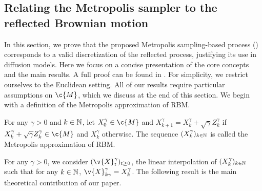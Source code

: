 \begin{table}[t]
	\centering
	\caption{Comparing the requirements of different constrained diffusion models.}
	\label{tab:general_method_comparison}

\end{table}

\subsection{Relating the Metropolis sampler to the reflected Brownian motion}
\label{sec:theoretical_convergence}

In this section, we prove that the proposed Metropolis sampling-based process () corresponds to a valid discretization of the reflected process, justifying its use in diffusion models.
Here we focus on a concise presentation of the core concepts and the main results.
A full proof can be found in .
For simplicity, we restrict ourselves to the Euclidean setting.
All of our results require particular assumptions on $\c{M}$, which we discuss at the end of this section.
We begin with a definition of the Metropolis approximation of RBM.

\begin{definition}
	For any $\gamma >0$ and $k \in \mathbb{N}$, let $X_0^\gamma \in \c{M}$ and $X_{k+1}^\gamma = X_k^\gamma + \sqrt{\gamma} Z_k^\gamma$ if $X_k^\gamma + \sqrt{\gamma} Z_k^\gamma \in \c{M}$ and $X_k^\gamma$ otherwise.
	The sequence $(X_k^\gamma)_{k \in \mathbb{N}}$ is called the {Metropolis approximation of RBM}.
\end{definition}
For any $\gamma > 0$, we consider $(\v{X}_t^\gamma)_{t \geq 0}$, the linear interpolation of $(X^\gamma_k)_{k \in \mathbb{N}}$ such that for any $k \in \mathbb{N}$, $\v{X}_{k \gamma}^\gamma = X_k^\gamma$.
The following result is the main theoretical contribution of our paper.


